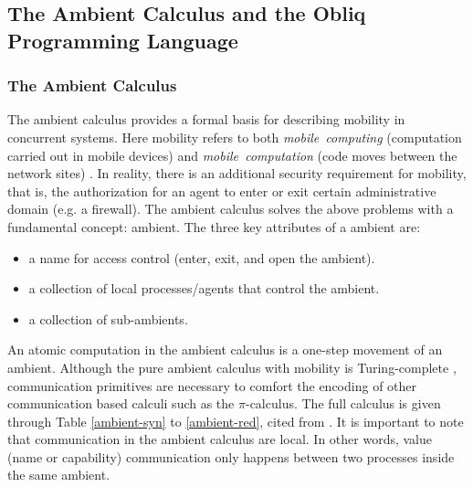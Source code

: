 \subsection{The Ambient Calculus and the Obliq Programming Language}
\label{sec:ambient}

\subsubsection{The Ambient Calculus}
The ambient calculus provides a formal basis for describing mobility in concurrent systems.  Here mobility refers to both {\it{mobile\ computing}} (computation carried out in mobile devices) and {\it{mobile\ computation}} (code moves between the network sites) \cite{MobileAmbients}.  In reality, there is an additional security requirement for mobility, that is, the authorization for an agent to enter or exit certain administrative domain (e.g. a firewall).  The ambient calculus solves the above problems with a fundamental concept: ambient.  The three key attributes of a ambient are:
\begin{itemize}
  \item a name for access control (enter, exit, and open the ambient).
  \item a collection of local processes/agents that control the ambient.  
  \item a collection of sub-ambients. 
\end{itemize}

An atomic computation in the ambient calculus is a one-step movement of an ambient.  Although the pure ambient calculus with mobility is Turing-complete \cite{MobileAmbients}, communication primitives are necessary to comfort the encoding of other communication based calculi such as the $\pi$-calculus.  The full calculus is given through Table \ref{ambient-syn} to \ref{ambient-red}, cited from \cite{MobileAmbients}.  It is important to note that communication in the ambient calculus are local.  In other words, value (name or capability) communication only happens between two processes inside the same ambient.

